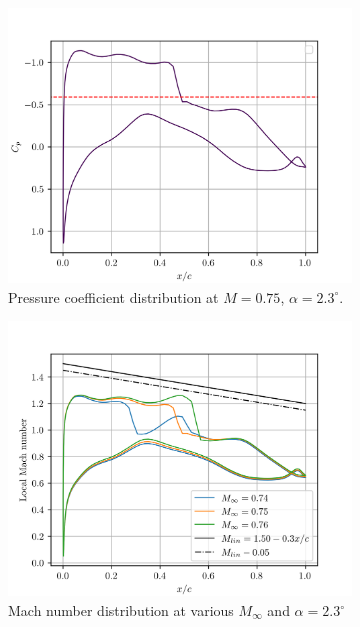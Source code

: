 \documentclass{article}
\begin{document}
\begin{figure}
    \centering
    \begin{subfigure}[t]{0.45\textwidth}
        \centering
        \includegraphics[width=\textwidth]{figures/cp_vs_xc_machs.png}
        \caption{Pressure coefficient distribution at $M=0.75$, $\alpha = 2.3^\circ$.}
        \label{fig:cp_vs_xc}
    \end{subfigure}
    \begin{subfigure}[t]{0.45\textwidth}
        \centering
        \includegraphics[width=\textwidth]{figures/mach_vs_xc.png}
        \caption{Mach number distribution at various $M_\infty$ and $\alpha = 2.3^\circ$}
        \label{fig:mach_vs_xc}
    \end{subfigure}
    \caption{}
\end{figure}
\end{document}
